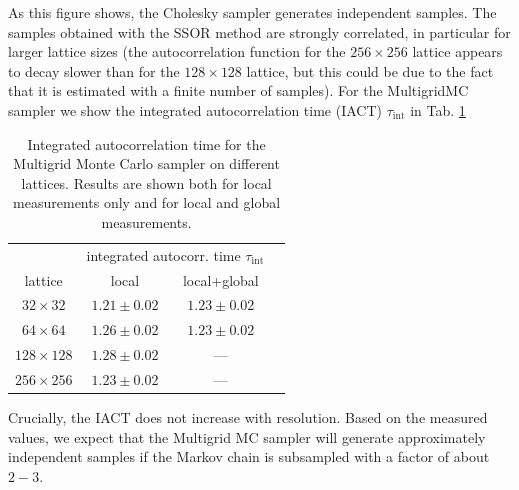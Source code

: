 \documentclass[11pt]{article}
\begin{document}
As this figure shows, the Cholesky sampler generates independent samples. The samples obtained with the SSOR method are strongly correlated, in particular for larger lattice sizes (the autocorrelation function for the $256\times 256$ lattice appears to decay slower than for the $128\times 128$ lattice, but this could be due to the fact that it is estimated with a finite number of samples). For the MultigridMC sampler we show the integrated autocorrelation time (IACT) $\tau_{\text{int}}$ in Tab. \ref{tab:tau_int}
\begin{table}
    \begin{center}
        \begin{tabular}{cccc}
            \hline
                     & \multicolumn{2}{c}{integrated autocorr. time $\tau_{\text{int}}$} \\
                     lattice& local & local+global\\
            \hline\hline
            $32 \times 32$  & $1.21 \pm  0.02$ & $1.23 \pm  0.02$   \\
            $64\times 64$   & $1.26 \pm 0.02$ & $1.23 \pm  0.02$    \\
            $128\times 128$ & $1.28 \pm  0.02$ & ---   \\
            $256\times256$  & $1.23 \pm  0.02$ & ---   \\
            \hline
        \end{tabular}
        \caption{Integrated autocorrelation time for the Multigrid Monte Carlo sampler on different lattices. Results are shown both for local measurements only and for local and global measurements.}
        \label{tab:tau_int}
    \end{center}
\end{table}
Crucially, the IACT does not increase with resolution. Based on the measured values, we expect that the Multigrid MC sampler will generate approximately independent samples if the Markov chain is subsampled with a factor of about $2-3$.
\end{document}
